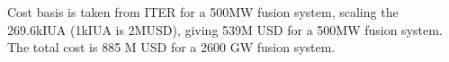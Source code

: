 Cost basis is taken from ITER for a 500MW fusion system, scaling the 269.6kIUA (1kIUA is 2MUSD), giving 539M USD for a 500MW fusion system. The total cost is 885 M USD for a 2600 GW fusion system.






